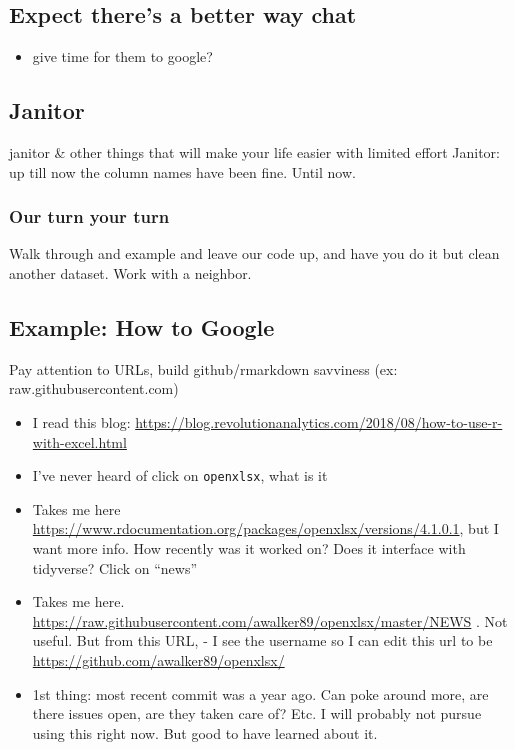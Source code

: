 \documentclass[]{book}
\providecommand{\tightlist}{%
  \setlength{\itemsep}{0pt}\setlength{\parskip}{0pt}}
\begin{document}
\hypertarget{expect-theres-a-better-way-chat}{%
\subsection{Expect there's a better way chat}\label{expect-theres-a-better-way-chat}}

\begin{itemize}
\tightlist
\item
  give time for them to google?
\end{itemize}

\hypertarget{janitor}{%
\subsection{Janitor}\label{janitor}}

janitor \& other things that will make your life easier with limited effort
Janitor: up till now the column names have been fine. Until now.

\hypertarget{our-turn-your-turn}{%
\subsubsection{Our turn your turn}\label{our-turn-your-turn}}

Walk through and example and leave our code up, and have you do it but clean another dataset. Work with a neighbor.

\hypertarget{example-how-to-google}{%
\subsection{Example: How to Google}\label{example-how-to-google}}

Pay attention to URLs, build github/rmarkdown savviness (ex: raw.githubusercontent.com)

\begin{itemize}
\tightlist
\item
  I read this blog: \url{https://blog.revolutionanalytics.com/2018/08/how-to-use-r-with-excel.html}
\item
  I've never heard of click on \texttt{openxlsx}, what is it
\item
  Takes me here \url{https://www.rdocumentation.org/packages/openxlsx/versions/4.1.0.1}, but I want more info. How recently was it worked on? Does it interface with tidyverse? Click on ``news''
\item
  Takes me here. \url{https://raw.githubusercontent.com/awalker89/openxlsx/master/NEWS} . Not useful. But from this URL, - I see the username so I can edit this url to be
  \url{https://github.com/awalker89/openxlsx/}
\item
  1st thing: most recent commit was a year ago. Can poke around more, are there issues open, are they taken care of? Etc. I will probably not pursue using this right now. But good to have learned about it.
\end{itemize}
\end{document}
